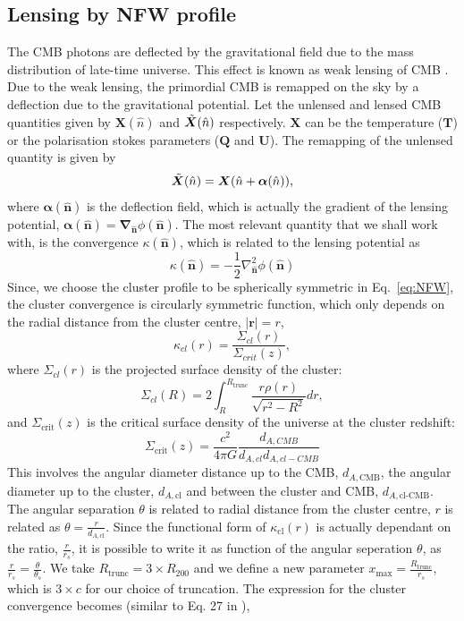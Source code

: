 \documentclass[prd, superscriptaddress, tightenlines, longbibliography, nofootinbib, eqsecnum, amsfonts, amsmath, floatfix, twocolumn, notitlepage]{revtex4-2}
\newcommand{\bs}[1]{\boldsymbol{#1}}
\begin{document}
\subsection{Lensing by NFW profile}
The CMB photons are deflected by the gravitational field due to the mass distribution of late-time universe. This effect is known as weak lensing of CMB \cite{Lewis:2006fu}. Due to the weak lensing, the primordial CMB is remapped on the sky by a deflection due to the gravitational potential. Let the unlensed and lensed CMB quantities given by $\bs{X} (\hat{n})$ and $\Tilde{\bs{X}} (\hat{n})$ respectively. $\bs{X}$ can be the temperature ($\bs{T}$) or the polarisation stokes parameters ($\bs{Q}$ and $\bs{U}$). The remapping of the unlensed quantity is given by
\begin{equation}
    \Tilde{\bs{X}} (\hat{n}) = \bs{X} (\hat{n} + \bs{\alpha}(\hat{n})),
\end{equation}
where $\bs{\alpha} (\hat{\bs{n}})$ is the deflection field, which is actually the gradient of the lensing potential, $\bs{\alpha} (\hat{\bs{n}})  = \bs{\nabla}_{\hat{\bs{n}}}\phi(\hat{\bs{n}})$. The most relevant quantity that we shall work with, is the convergence $\kappa (\hat{\bs{n}})$, which is related to the lensing potential as
\begin{equation}
    \kappa(\hat{\bs{n}}) = -\frac{1}{2}\nabla^2_{\hat{\bs{n}}}\phi(\hat{\bs{n}})
\end{equation}
Since, we choose the cluster profile to be spherically symmetric in Eq.~\eqref{eq:NFW}, the cluster convergence is circularly symmetric function, which only depends on the radial distance from the cluster centre, $|\bs{r}|= r$,
\begin{equation}
    \kappa_{cl}(r) = \frac{\Sigma_{cl}(r)}{\Sigma_{crit}(z)},
\end{equation}
where $\Sigma_{cl}(r)$ is the projected surface density of the cluster:
\begin{equation}
    \Sigma_{cl}(R) = 2 \int_{R}^{R_{\text{trunc}}}\frac{r\rho(r)}{\sqrt{r^2-R^2}} dr,
\end{equation}
and $\Sigma_{\text{crit}}(z)$ is the critical surface density of the universe at the cluster redshift:
\begin{equation}
    \Sigma_{\text{crit}}(z) = \frac{c^2}{4\pi G}\frac{d_{A,CMB}}{d_{A,cl}d_{A,cl-CMB}}
\end{equation}
This involves the angular diameter distance up to the CMB, $d_{A,\text{CMB}}$, the angular diameter up to the cluster, $d_{A,\text{cl}}$ and between the cluster and CMB, $d_{A,\text{cl-CMB}}$. The angular separation $\theta$ is related to radial distance from the cluster centre, $r$ is related as $\theta = \frac{r}{d_{A,\text{cl}}}$.  Since the functional form of $\kappa_{\text{cl}} (r)$ is actually dependant on the ratio, $\frac{r}{r_s}$, it is possible to write it as function of the angular seperation $\theta$, as $\frac{r}{r_s} = \frac{\theta}{\theta_s}$. We take $R_{\text{trunc}} = 3\times R_{200}$ and we define a new parameter $x_{\text{max}} = \frac{R_{\text{trunc}}}{r_s}$, which is $3\times c$ for our choice of truncation. The expression for the cluster convergence becomes (similar to Eq. 27 in \cite{Takada:2002qq}),
\end{document}
